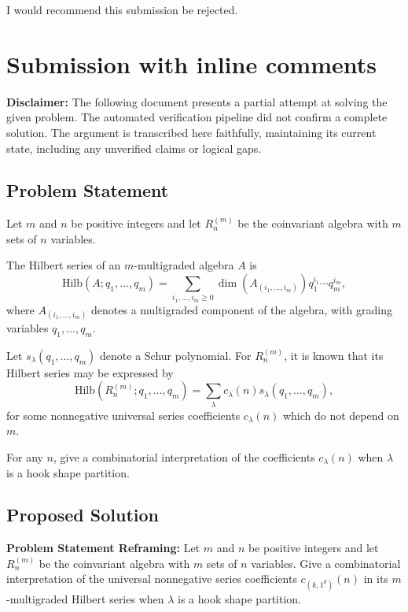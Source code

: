 \documentclass[12pt]{article}
\begin{document}
I would recommend this submission be rejected.

  \section{Submission with inline comments}

%
\date{}



\begin{center}
    \textbf{Disclaimer:} The following document presents a partial attempt at solving the given problem. The automated verification pipeline did not confirm a complete solution. The argument is transcribed here faithfully, maintaining its current state, including any unverified claims or logical gaps.
\end{center}

\subsection*{Problem Statement}

Let $m$ and $n$ be positive integers and let $R_n^{(m)}$ be the coinvariant algebra with $m$ sets of $n$ variables.

The Hilbert series of an $m$-multigraded algebra $A$ is
\[
\mathrm{Hilb}(A;q_1,\ldots ,q_m)= \sum_{i_1,\ldots,i_m \geq 0} \dim(A_{(i_1,\ldots,i_m)})q_1^{i_1} \cdots q_m^{i_m},
\]
where $A_{(i_1,\ldots,i_m)}$ denotes a multigraded component of the algebra, with grading variables $q_1,\ldots, q_m$.

Let $s_\lambda(q_1,\ldots ,q_m)$ denote a Schur polynomial. For $R_n^{(m)}$, it is known that its Hilbert series may be expressed by 
\[
\mathrm{Hilb}(R_n^{(m)};q_1,\ldots ,q_m)= \sum_{\lambda}
c_{\lambda}(n)s_\lambda(q_1,\ldots ,q_m),
\]
for some nonnegative universal series coefficients $c_\lambda(n)$ which do not depend on $m$.

For any $n$, give a combinatorial interpretation of the coefficients $c_{\lambda}(n)$ when $\lambda$ is a hook shape partition.

\subsection*{Proposed Solution}

\textbf{Problem Statement Reframing:} Let $m$ and $n$ be positive integers and let $R_n^{(m)}$ be the coinvariant algebra with $m$ sets of $n$ variables. Give a combinatorial interpretation of the universal nonnegative series coefficients $c_{(k, 1^d)}(n)$ in its $m$-multigraded Hilbert series when $\lambda$ is a hook shape partition.
\end{document}
